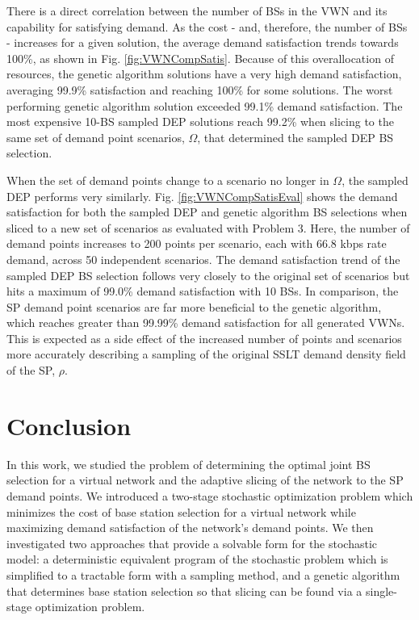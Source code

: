 \documentclass[conference]{IEEEtran}
\begin{document}
There is a direct correlation between the number of BSs in the VWN and its capability for satisfying demand.  As the cost - and, therefore, the number of BSs - increases for a given solution, the average demand satisfaction trends towards 100\%, as shown in Fig. \ref{fig:VWNCompSatis}.  Because of this overallocation of resources, the genetic algorithm solutions have a very high demand satisfaction, averaging 99.9\% satisfaction and reaching 100\% for some solutions.  The worst performing genetic algorithm solution exceeded 99.1\% demand satisfaction.  The most expensive 10-BS sampled DEP solutions reach 99.2\% when slicing to the same set of demand point scenarios, $\Omega$, that determined the sampled DEP BS selection.

When the set of demand points change to a scenario no longer in $\Omega$, the sampled DEP performs very similarly.  Fig. \ref{fig:VWNCompSatisEval} shows the demand satisfaction for both the sampled DEP and genetic algorithm BS selections when sliced to a new set of scenarios as evaluated with Problem 3.  Here, the number of demand points increases to 200 points per scenario, each with 66.8 kbps rate demand, across 50 independent scenarios.  The demand satisfaction trend of the sampled DEP BS selection follows very closely to the original set of scenarios but hits a maximum of 99.0\% demand satisfaction with 10 BSs.  In comparison, the SP demand point scenarios are far more beneficial to the genetic algorithm, which reaches greater than 99.99\% demand satisfaction for all generated VWNs.  This is expected as a side effect of the increased number of points and scenarios more accurately describing a sampling of the original SSLT demand density field of the SP, $\rho$.

\section{Conclusion} \label{sec:conclusion}

In this work, we studied the problem of determining the optimal joint BS selection for a virtual network and the adaptive slicing of the network to the SP demand points.  We introduced a two-stage stochastic optimization problem which minimizes the cost of base station selection for a virtual network while maximizing demand satisfaction of the network's demand points.  We then investigated two approaches that provide a solvable form for the stochastic model: a deterministic equivalent program of the stochastic problem which is simplified to a tractable form with a sampling method, and a genetic algorithm that determines base station selection so that slicing can be found via a single-stage optimization problem.
\end{document}
